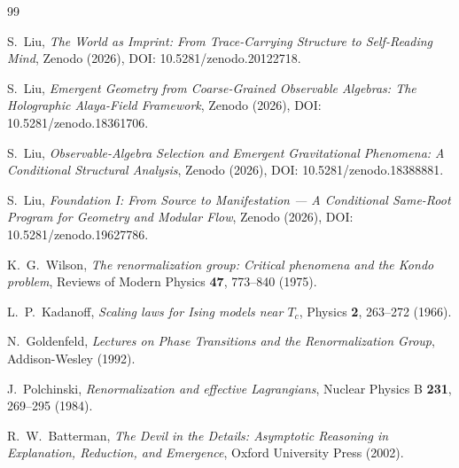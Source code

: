 \documentclass[12pt,a4paper]{article}
\begin{document}
\begin{thebibliography}{99}

S.~Liu, \emph{The World as Imprint: From Trace-Carrying Structure to Self-Reading Mind}, Zenodo (2026), DOI: 10.5281/zenodo.20122718.

S.~Liu, \emph{Emergent Geometry from Coarse-Grained Observable Algebras: The Holographic Alaya-Field Framework}, Zenodo (2026), DOI: 10.5281/zenodo.18361706.

S.~Liu, \emph{Observable-Algebra Selection and Emergent Gravitational Phenomena: A Conditional Structural Analysis}, Zenodo (2026), DOI: 10.5281/zenodo.18388881.

S.~Liu, \emph{Foundation I: From Source to Manifestation --- A Conditional Same-Root Program for Geometry and Modular Flow}, Zenodo (2026), DOI: 10.5281/zenodo.19627786.

K.~G.~Wilson,
\emph{The renormalization group: Critical phenomena and the Kondo problem},
Reviews of Modern Physics \textbf{47}, 773--840 (1975).

L.~P.~Kadanoff,
\emph{Scaling laws for Ising models near $T_c$},
Physics \textbf{2}, 263--272 (1966).

N.~Goldenfeld,
\emph{Lectures on Phase Transitions and the Renormalization Group},
Addison-Wesley (1992).

J.~Polchinski,
\emph{Renormalization and effective Lagrangians},
Nuclear Physics B \textbf{231}, 269--295 (1984).

R.~W.~Batterman,
\emph{The Devil in the Details: Asymptotic Reasoning in Explanation, Reduction, and Emergence},
Oxford University Press (2002).

\end{thebibliography}
\end{document}
